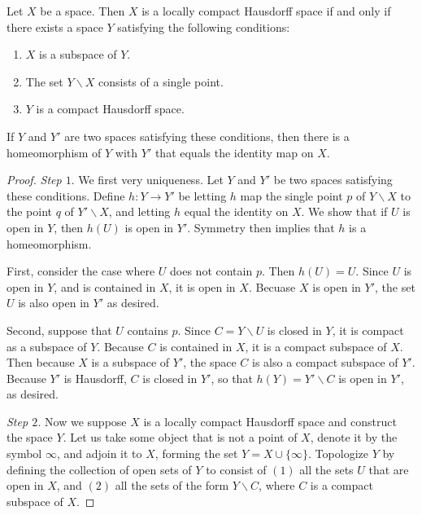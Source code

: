 \documentclass[12pt, a4paper, oneside, openright, titlepage]{book}
\begin{document}
\begin{theorem}
    Let $X$ be a space. Then $X$ is a locally compact Hausdorff space if and only if there exists a space $Y$ satisfying the following conditions: \begin{enumerate}
        \item $X$ is a subspace of $Y$.
        \item The set $Y\backslash X$ consists of a single point.
        \item $Y$ is a compact Hausdorff space.
    \end{enumerate}
    If $Y$ and $Y'$ are two spaces satisfying these conditions, then there is a homeomorphism of $Y$ with $Y'$ that equals the identity map on $X$.
\end{theorem}
\begin{proof}
    \emph{Step $1.$} We first very uniqueness. Let $Y$ and $Y'$ be two spaces satisfying these conditions. Define $h:Y\rightarrow Y'$ be letting $h$ map the single point $p$ of $Y\backslash X$ to the point $q$ of $Y'\backslash X$, and letting $h$ equal the identity on $X$. We show that if $U$ is open in $Y$, then $h(U)$ is open in $Y'$. Symmetry then implies that $h$ is a homeomorphism.

    First, consider the case where $U$ does not contain $p$. Then $h(U) = U$. Since $U$ is open in $Y$, and is contained in $X$, it is open in $X$. Becuase $X$ is open in $Y'$, the set $U$ is also open in $Y'$ as desired.

    Second, suppose that $U$ contains $p$. Since $C = Y\backslash U$ is closed in $Y$, it is compact as a subspace of $Y$. Because $C$ is contained in $X$, it is a compact subspace of $X$. Then because $X$ is a subspace of $Y'$, the space $C$ is also a compact subspace of $Y'$. Because $Y'$ is Hausdorff, $C$ is closed in $Y'$, so that $h(Y) = Y'\backslash C$ is open in $Y'$, as desired.

    \emph{Step $2$.} Now we suppose $X$ is a locally compact Hausdorff space and construct the space $Y$. Let us take some object that is not a point of $X$, denote it by the symbol $\infty$, and adjoin it to $X$, forming the set $Y = X \cup \{\infty\}$. Topologize $Y$ by defining the collection of open sets of $Y$ to consist of $(1)$ all the sets $U$ that are open in $X$, and $(2)$ all the sets of the form $Y \backslash C$, where $C$ is a compact subspace of $X$.


\end{proof}
\end{document}
